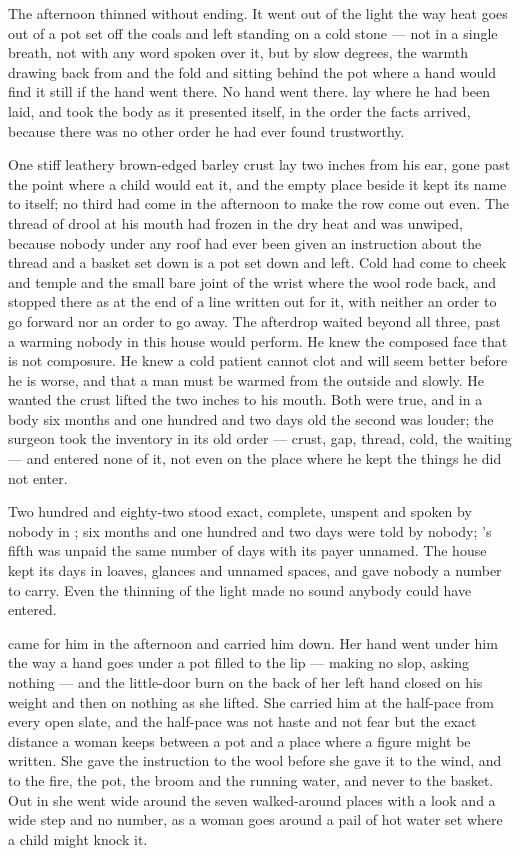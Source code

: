 The afternoon thinned without ending. It went out of the light the way heat goes out of a pot set off the coals and left standing on a cold stone --- not in a single breath, not with any word spoken over it, but by slow degrees, the warmth drawing back from  and the fold and sitting behind the pot where a hand would find it still if the hand went there. No hand went there.  lay where he had been laid, and took the body as it presented itself, in the order the facts arrived, because there was no other order he had ever found trustworthy.

One stiff leathery brown-edged barley crust lay two inches from his ear, gone past the point where a child would eat it, and the empty place beside it kept its name to itself; no third had come in the afternoon to make the row come out even. The thread of drool at his mouth had frozen in the dry heat and was unwiped, because nobody under any roof had ever been given an instruction about the thread and a basket set down is a pot set down and left. Cold had come to cheek and temple and the small bare joint of the wrist where the wool rode back, and stopped there as at the end of a line written out for it, with neither an order to go forward nor an order to go away. The afterdrop waited beyond all three, past a warming nobody in this house would perform. He knew the composed face that is not composure. He knew a cold patient cannot clot and will seem better before he is worse, and that a man must be warmed from the outside and slowly. He wanted the crust lifted the two inches to his mouth. Both were true, and in a body six months and one hundred and two days old the second was louder; the surgeon took the inventory in its old order --- crust, gap, thread, cold, the waiting --- and entered none of it, not even on the place where he kept the things he did not enter.

Two hundred and eighty-two stood exact, complete, unspent and spoken by nobody in ; six months and one hundred and two days were told by nobody; 's fifth was unpaid the same number of days with its payer unnamed. The house kept its days in loaves, glances and unnamed spaces, and gave nobody a number to carry. Even the thinning of the light made no sound anybody could have entered.

 came for him in the afternoon and carried him down. Her hand went under him the way a hand goes under a pot filled to the lip --- making no slop, asking nothing --- and the little-door burn on the back of her left hand closed on his weight and then on nothing as she lifted. She carried him at the half-pace from every open slate, and the half-pace was not haste and not fear but the exact distance a woman keeps between a pot and a place where a figure might be written. She gave the instruction to the wool before she gave it to the wind, and to the fire, the pot, the broom and the running water, and never to the basket. Out in  she went wide around the seven walked-around places with a look and a wide step and no number, as a woman goes around a pail of hot water set where a child might knock it.

